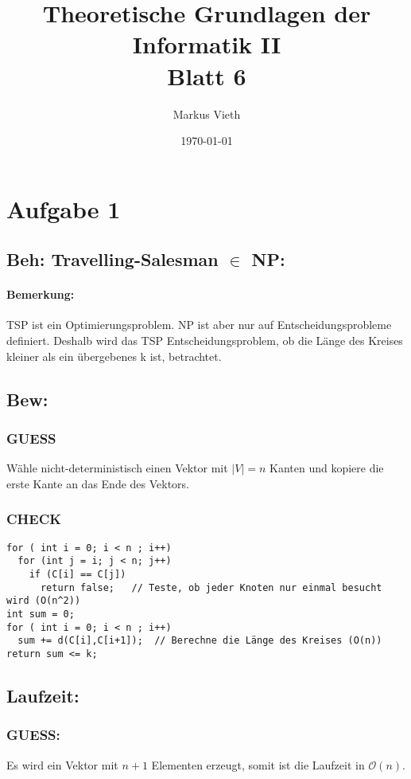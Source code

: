 \documentclass[a4paper,11pt,twoside]{article}
\title{Theoretische Grundlagen der Informatik II\\ Blatt 6}
\author{Markus Vieth}
\date{\today}
\begin{document}
\maketitle
\cleardoublepage
\pagestyle{myheadings}

\section*{Aufgabe 1}
\subsection*{Beh: Travelling-Salesman $\in$ NP:}
\paragraph{Bemerkung:} TSP ist ein Optimierungsproblem. NP ist aber nur auf Entscheidungsprobleme definiert. Deshalb wird das TSP Entscheidungsproblem, ob die Länge des Kreises kleiner als ein übergebenes k ist, betrachtet.
\subsection*{Bew:}
\subsubsection*{GUESS}
Wähle nicht-deterministisch einen Vektor mit $|V| = n$ Kanten und kopiere die erste Kante an das Ende des Vektors.

\subsubsection*{CHECK}
\begin{lstlisting}
for ( int i = 0; i < n ; i++)
  for (int j = i; j < n; j++)
    if (C[i] == C[j])
      return false;   // Teste, ob jeder Knoten nur einmal besucht wird (O(n^2))
int sum = 0;
for ( int i = 0; i < n ; i++)
  sum += d(C[i],C[i+1]);  // Berechne die Länge des Kreises (O(n))
return sum <= k;
\end{lstlisting}
\subsection*{Laufzeit:}
\subsubsection*{GUESS:}
Es wird ein Vektor mit $n+1$ Elementen erzeugt, somit ist die Laufzeit in $\mathcal{O}(n)$.
\end{document}
